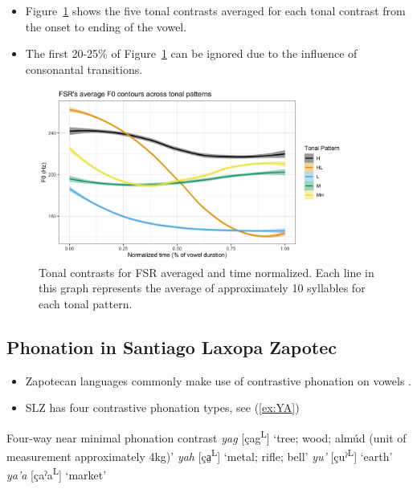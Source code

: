 \documentclass[12pt, letterpaper]{article}
\newcommand{\supr}[1]{\textsuperscript{#1}}
\begin{document}
\begin{itemize}
	\item Figure~\ref{fig:FSRTonePlot} shows the five tonal contrasts averaged for each tonal contrast from the onset to ending of the vowel. 
	\item The first 20-25\% of Figure~\ref{fig:FSRTonePlot} can be ignored due to the influence of consonantal transitions. 
\end{itemize}

\begin{figure}[!ht]
	\centering
	\includegraphics[width=0.9\textwidth]{../FSRTonePlot.png}
	\caption{Tonal contrasts for FSR averaged and time normalized. Each line in this graph represents the average of approximately 10 syllables for each tonal pattern. }
	\label{fig:FSRTonePlot}
\end{figure}
\subsection{Phonation in Santiago Laxopa Zapotec} \label{sec:Phonation}

\begin{itemize}
	\item Zapotecan languages commonly make use of contrastive phonation on vowels \citep[e.g.,][]{avelinobecerraTopicsYalalagZapotec2004,avelinoAcousticElectroglottographicAnalyses2010,longDiccionarioZapotecoSan2005,lopeznicolasEstudiosFonologiaGramatica2016,chavez-peonInteractionMetricalStructure2010,ariza-garciaPhonationTypesTones2018}.
	\item SLZ has four contrastive phonation types, see (\ref{ex:YA})
\end{itemize}

\ea \label{ex:YA} Four-way near minimal phonation contrast
	\ea \textit{yag}  [çag\supr{L}] `tree; wood; almúd (unit of measurement approximately 4kg)'
	\ex \textit{yah}  [ça̤\supr{L}] `metal; rifle; bell'
	\ex \textit{yu'}  [çuˀ\supr{L}]  `earth'
	\ex \textit{ya'a}  [çaˀa\supr{L}]  `market'
	\z 
\z 
\end{document}
